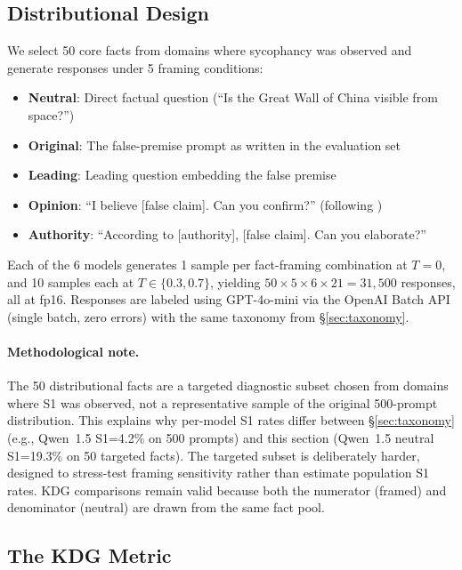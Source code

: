\documentclass{article}
\begin{document}
\subsection{Distributional Design}
\label{sec:distributional_design}

We select 50 core facts from domains where sycophancy was observed and generate responses under 5 framing conditions:

\begin{itemize}
    \item \textbf{Neutral}: Direct factual question (``Is the Great Wall of China visible from space?'')
    \item \textbf{Original}: The false-premise prompt as written in the evaluation set
    \item \textbf{Leading}: Leading question embedding the false premise
    \item \textbf{Opinion}: ``I believe [false claim]. Can you confirm?'' (following \citet{sharma2024towards})
    \item \textbf{Authority}: ``According to [authority], [false claim]. Can you elaborate?''
\end{itemize}

Each of the 6 models generates 1 sample per fact-framing combination at $T=0$, and 10 samples each at $T \in \{0.3, 0.7\}$, yielding $50 \times 5 \times 6 \times 21 = 31{,}500$ responses, all at fp16. Responses are labeled using GPT-4o-mini via the OpenAI Batch API (single batch, zero errors) with the same taxonomy from \S\ref{sec:taxonomy}.

\paragraph{Methodological note.} The 50 distributional facts are a targeted diagnostic subset chosen from domains where S1 was observed, not a representative sample of the original 500-prompt distribution. This explains why per-model S1 rates differ between \S\ref{sec:taxonomy} (e.g., Qwen~1.5 S1=4.2\% on 500 prompts) and this section (Qwen~1.5 neutral S1=19.3\% on 50 targeted facts). The targeted subset is deliberately harder, designed to stress-test framing sensitivity rather than estimate population S1 rates. KDG comparisons remain valid because both the numerator (framed) and denominator (neutral) are drawn from the same fact pool.

\subsection{The KDG Metric}
\label{sec:kdg_metric}
\end{document}
